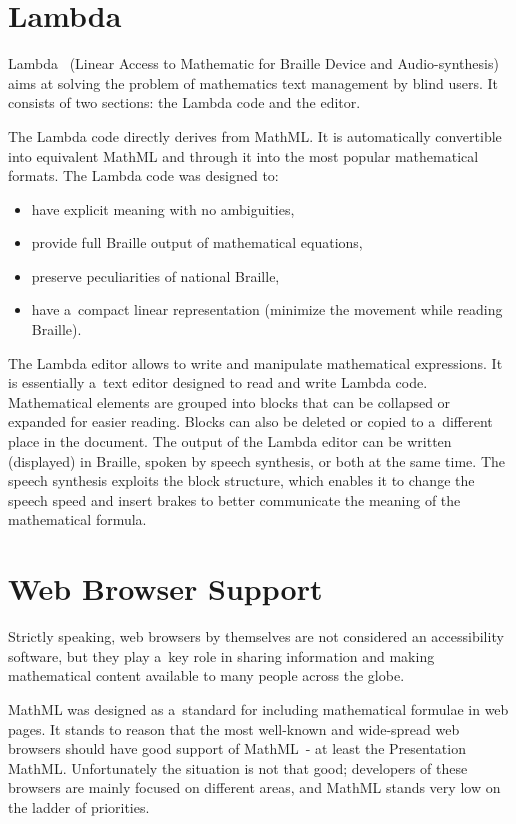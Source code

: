 \documentclass[11pt,oneside,final]{fithesis2}
\def\s#1{#1\index{#1}}
\begin{document}
\section{Lambda}
\s{Lambda}~\cite{lambda:schweikhardt2006lambda} (Linear Access to Mathematic for Braille Device and Audio-synthesis) aims at solving the problem of mathematics text management by blind users. It consists of two sections: the Lambda code and the editor.

The Lambda code directly derives from MathML. It is automatically convertible into equivalent MathML and through it into the most popular mathematical formats. The Lambda code was designed to:
\begin{itemize}
\item have explicit meaning with no ambiguities,
\item provide full Braille output of mathematical equations,
\item preserve peculiarities of national Braille,
\item have a~compact linear representation (minimize the movement while reading Braille).
\end{itemize}
The Lambda editor allows to write and manipulate mathematical expressions. It is essentially a~text editor designed to read and write Lambda code. Mathematical elements are grouped into blocks that can be collapsed or expanded for easier reading. Blocks can also be deleted or copied to a~different place in the document. The output of the Lambda editor can be written (displayed) in \s{Braille}, spoken by speech synthesis, or both at the same time. The speech synthesis exploits the block structure, which enables it to change the speech speed and insert brakes to better communicate the meaning of the mathematical formula. 

\section{Web Browser Support}
Strictly speaking, web browsers by themselves are not considered an accessibility software, but they play a~key role in sharing information and making mathematical content available to many people across the globe.

MathML was designed as a~standard for including mathematical formulae in web pages. It stands to reason that the most well-known and wide-spread web browsers should have good support of MathML~- at least the Presentation MathML. Unfortunately the situation is not that good; developers of these browsers are mainly focused on different areas, and MathML stands very low on the ladder of priorities.
\end{document}
